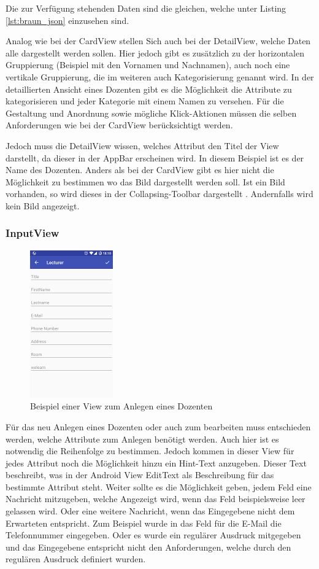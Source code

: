 Die zur Verfügung  stehenden Daten sind die gleichen, welche unter Listing \ref{lst:braun_json} einzusehen sind.

Analog wie bei der CardView stellen Sich auch bei der DetailView, welche Daten alle dargestellt werden sollen. Hier jedoch gibt es zusätzlich zu der horizontalen Gruppierung (Beispiel mit den Vornamen und Nachnamen), auch noch eine vertikale Gruppierung, die im weiteren auch Kategorisierung genannt wird. In der detaillierten Ansicht eines Dozenten gibt es die Möglichkeit die Attribute zu kategorisieren und jeder Kategorie mit einem Namen zu versehen. Für die Gestaltung und Anordnung sowie mögliche Klick-Aktionen müssen die selben Anforderungen wie bei der CardView berücksichtigt werden. 

Jedoch muss die DetailView wissen, welches Attribut den Titel der View darstellt, da dieser in der AppBar erscheinen wird. In diesem Beispiel ist es der Name des Dozenten. Anders als bei der CardView gibt es hier nicht die Möglichkeit zu bestimmen wo das Bild dargestellt werden soll. Ist ein Bild vorhanden, so wird dieses in der Collapsing-Toolbar dargestellt \cite{collapsing}. Andernfalls wird kein Bild angezeigt.

\subsubsection{InputView}

\begin{figure}[H]
	\begin{center}
		\includegraphics{images/input.png}
		\caption{Beispiel einer View zum Anlegen eines Dozenten}
		\label{fig:input}
	\end{center}
\end{figure}

Für das neu Anlegen eines Dozenten oder auch zum bearbeiten muss entschieden werden, welche Attribute zum Anlegen benötigt werden. Auch hier ist es notwendig die Reihenfolge zu bestimmen. Jedoch kommen in dieser View für jedes Attribut noch die Möglichkeit hinzu ein Hint-Text anzugeben. Dieser Text beschreibt, was in der Android View EditText als Beschreibung für das bestimmte Attribut steht. Weiter sollte es die Möglichkeit geben, jedem Feld eine Nachricht mitzugeben, welche Angezeigt wird, wenn das Feld beispielsweise leer gelassen wird. Oder eine weitere Nachricht, wenn das Eingegebene nicht dem Erwarteten entspricht. Zum Beispiel wurde in das Feld für die E-Mail die Telefonnummer eingegeben. Oder es wurde ein regulärer Ausdruck mitgegeben und das Eingegebene entspricht nicht den Anforderungen, welche durch den regulären Ausdruck definiert wurden.

